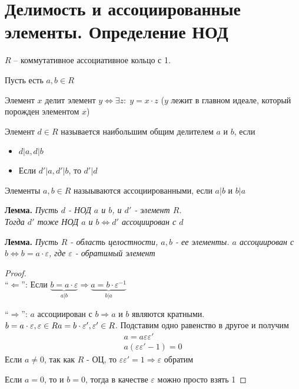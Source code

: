 
\section{Делимость и ассоциированные элементы. Определение НОД}
\begin{normalsize}
    $R$ -- коммутативное ассоциативное кольцо с 1.
    \begin{theorem-non}
        Пусть есть $a, b \in R$
        \begin{conj}
            Элемент $x$ делит элемент $y \Longleftrightarrow \exists z: \; y = x \cdot z$ ($y$ лежит в главном идеале, который порожден элементом $x$)
        \end{conj}
        \begin{conj}
            Элемент $d \in R$ называется наибольшим общим делителем $a$ и $b$, если \begin{itemize}
                \item $d | a, d | b$
                \item Если $d' | a, d' | b$, то $d' | d$
            \end{itemize}
        \end{conj}
    \end{theorem-non}
        \begin{conj}
            Элементы $a, b \in R$ назыываются ассоциированными, если $a|b$ и $b|a$
        \end{conj}
        \textbf{Лемма.}
        \textit{Пусть $d$ - НОД $a$ и $b$, и $d'$ - элемент $R$. \\
        Тогда $d'$ тоже НОД $a$ и $b \Longleftrightarrow d'$ ассоциирован с $d$}

        \textbf{Лемма.} 
        \textit{
            Пусть $R$ - область целостности, $a, b$ - ее элементы. $a$ ассоциирован с $b \Longleftrightarrow b = a \cdot \varepsilon$, 
            где $\varepsilon$ - обратимый элемент 
        } 
        \begin{proof} \quad \\
            ``$\Longleftarrow$'': Если $\underbrace{b = a \cdot \varepsilon}_{a | b} \Longrightarrow \underbrace{a = b \cdot \varepsilon^{-1}}_{b | a}$ 

            ``$\Longrightarrow$'': $a$ ассоциирован с $b \Longrightarrow a$ и $b$ являются кратными. $b = a \cdot \varepsilon, \varepsilon \in R \\
            a = b \cdot \varepsilon', \varepsilon' \in R$. Подставим одно равенство в другое и получим 
            \begin{gather*}
                a = a\varepsilon\varepsilon' \\
                a(\varepsilon\varepsilon' - 1) = 0
            \end{gather*}
            Если $a \neq 0$, так как $R$ - ОЦ, то $\varepsilon\varepsilon' = 1 \Longrightarrow \varepsilon$ обратим 
            
            Если $a = 0$, то и $b = 0$, тогда в качестве $\varepsilon$ можно просто взять 1
        \end{proof}
\end{normalsize}
